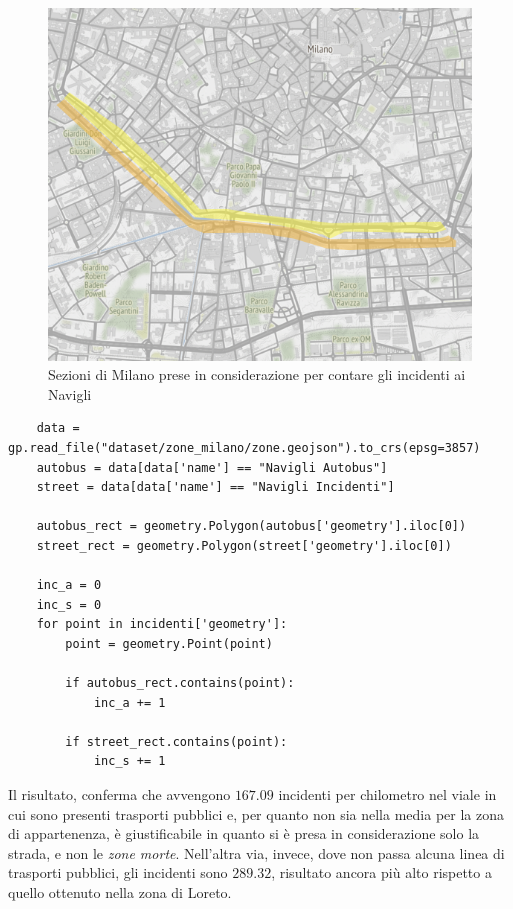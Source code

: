 \documentclass[a4paper,12pt]{report}
\newcommand{\quotestyle}[1]{\textit{#1}}
\begin{document}
\begin{figure}
    \includegraphics[width=\linewidth]{../src/atm/zona_navigli_rect.png}
    \caption{Sezioni di Milano prese in considerazione per contare gli incidenti ai Navigli}
    \label{fig:zona-navigli-rect}
\end{figure}

\begin{lstlisting}
    data = gp.read_file("dataset/zone_milano/zone.geojson").to_crs(epsg=3857)
    autobus = data[data['name'] == "Navigli Autobus"]
    street = data[data['name'] == "Navigli Incidenti"]

    autobus_rect = geometry.Polygon(autobus['geometry'].iloc[0])
    street_rect = geometry.Polygon(street['geometry'].iloc[0])

    inc_a = 0
    inc_s = 0
    for point in incidenti['geometry']: 
        point = geometry.Point(point)

        if autobus_rect.contains(point): 
            inc_a += 1
        
        if street_rect.contains(point): 
            inc_s += 1
\end{lstlisting}

Il risultato, conferma che avvengono $167.09$ incidenti per chilometro 
nel viale in cui sono presenti trasporti pubblici e, per quanto non sia nella media per la zona 
di appartenenza, è giustificabile in quanto si è presa in considerazione solo la strada, 
e non le \quotestyle{zone morte}.
Nell'altra via, invece, dove non passa alcuna linea di trasporti pubblici, 
gli incidenti sono $289.32$, risultato ancora più alto rispetto a quello ottenuto 
nella zona di Loreto. 
\end{document}
